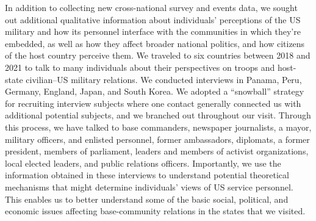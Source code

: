 In addition to collecting new cross-national survey and events data, we sought out additional qualitative information about individuals' perceptions of the US military and how its personnel interface with the communities in which they're embedded, as well as how they affect broader national politics, and how citizens of the host country perceive them. We traveled to six countries between 2018 and 2021 to talk to many individuals about their perspectives on troops and host-state civilian--US military relations. We conducted interviews in Panama, Peru, Germany, England, Japan, and South Korea. We adopted a ``snowball'' strategy for recruiting interview subjects where one contact generally connected us with additional potential subjects, and we branched out throughout our visit. Through this process, we have talked to base commanders, newspaper journalists, a mayor, military officers, and enlisted personnel, former ambassadors, diplomats, a former president, members of parliament, leaders and members of activist organizations, local elected leaders, and public relations officers. Importantly, we use the information obtained in these interviews to understand potential theoretical mechanisms that might determine individuals' views of US service personnel. This enables us to better understand some of the basic social, political, and economic issues affecting base-community relations in the states that we visited. 





